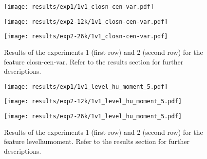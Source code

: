 \begin{figure}[h!]
	\centering
	\begin{minipage}{0.4\linewidth}
		\texttt{[image: results/exp1/1v1\_closn-cen-var.pdf]}
	\end{minipage}
	
	\begin{minipage}{0.4\linewidth}
		\texttt{[image: results/exp2-12k/1v1\_closn-cen-var.pdf]}
	\end{minipage}
	\begin{minipage}{0.4\linewidth}
		\texttt{[image: results/exp2-26k/1v1\_closn-cen-var.pdf]}
	\end{minipage}
	
	\caption[ Results: Feature closn-cen-var]{ Results of the experiments 1 (first row) and 2 (second row) for the feature closn-cen-var. Refer to the results section for further descriptions. }
	\label{fig:appendix_closn-cen-var}
\end{figure}

\begin{figure}[h!]
	\centering
	\begin{minipage}{0.4\linewidth}
		\texttt{[image: results/exp1/1v1\_level\_hu\_moment\_5.pdf]}
	\end{minipage}
	
	\begin{minipage}{0.4\linewidth}
		\texttt{[image: results/exp2-12k/1v1\_level\_hu\_moment\_5.pdf]}
	\end{minipage}
	\begin{minipage}{0.4\linewidth}
		\texttt{[image: results/exp2-26k/1v1\_level\_hu\_moment\_5.pdf]}
	\end{minipage}
	
	\caption[ Results: Feature level\textunderscore hu\textunderscore moment]{ Results of the experiments 1 (first row) and 2 (second row) for the feature level\textunderscore hu\textunderscore moment. Refer to the results section for further descriptions. }
	\label{fig:appendix_level_hu_moment_5}
\end{figure}
\newpage 



